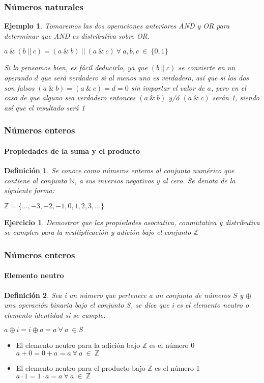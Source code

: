 \documentclass[11pt]{beamer}
\newtheorem{defi}{Definición}
\newtheorem{eje}{Ejercicio}
\newtheorem{ejem}{Ejemplo}
\begin{document}
\begin{frame}
\frametitle{Números naturales}
\begin{ejem}
Tomaremos las dos operaciones anteriores AND y OR para determinar que AND es distributiva sobre OR.\\
\begin{center}
$a~\&~(b~||~c) = (a~\&~b)~||~(a~\&~c)~\forall~a,b,c~\in~\{0,1\}$
\end{center}
Si lo pensamos bien, es fácil deducirlo, ya que $(b~||~c)$ se convierte en un operando $d$ que será verdadero si al menos uno es verdadero, así que si los dos son falsos $(a~\&~b) = (a~\&~c) = d = 0$ sin importar el valor de $a$, pero en el caso de que alguno sea verdadero entonces $(a~\&~b)$ y/ó $(a~\&~c)$ serán 1, siendo así que el resultado será 1
\end{ejem}
\end{frame}

\begin{frame}
\frametitle{Números enteros}
\framesubtitle{Propiedades de la suma y el producto}
\begin{defi}
Se conoce como números enteros al conjunto numérico que contiene al conjunto $\mathbb{N}$, a sus inversos negativos
y al cero. Se denota de la siguiente forma:\\
\begin{center}
$\mathbb{Z} = \{...,-3,-2,-1,0,1,2,3,...\}$
\end{center} 
\end{defi}
\begin{eje}
Demostrar que las propiedades asociativa, conmutativa y distributiva se cumplen para la multiplicación y adición bajo el 
conjunto $\mathbb{Z}$ 
\end{eje}
\end{frame}

\begin{frame}
\frametitle{Números enteros}
\framesubtitle{Elemento neutro}
\begin{defi}
Sea i un número que pertenece a un conjunto de números $S$ y $\oplus$ una operación binaria bajo el conjunto $S$, 
se dice que i es el elemento neutro o elemento identidad si se cumple:\\
\begin{center}
$ a \oplus i = i \oplus a = a~\forall ~a~\in S$
\end{center}
\end{defi}
\begin{itemize}
\item El elemento neutro para la adición bajo $\mathbb{Z}$ es el número 0\\
$a + 0 = 0 + a = a~\forall~a~\in~\mathbb{Z}$
\item El elemento neutro para el producto bajo $\mathbb{Z}$ es el número 1
$a \cdot 1 = 1 \cdot a = a~\forall~a~\in~\mathbb{Z}$
\end{itemize}
\end{frame}
\end{document}
